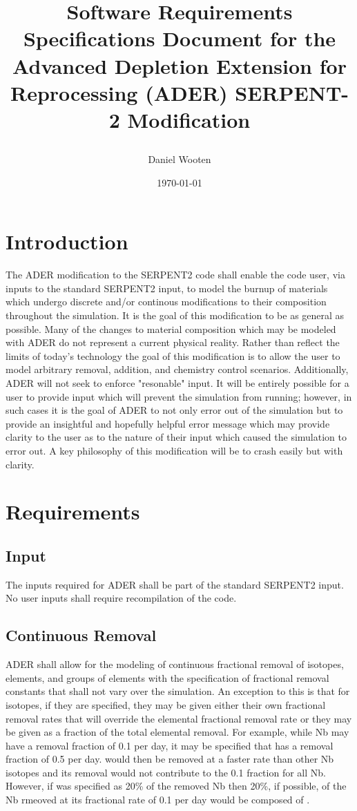 \documentclass[12pt]{article}
\title{Software Requirements Specifications Document for the Advanced Depletion Extension for Reprocessing (ADER) SERPENT-2 Modification \\ {\small \date{\today}}}
\author{Daniel Wooten}
\begin{document}
\maketitle

\section{Introduction}
The ADER modification to the SERPENT2 code shall enable the code user, via
inputs to the standard SERPENT2 input, to model the burnup of materials which
undergo discrete and/or continous modifications to their composition throughout
the simulation. It is the goal of this modification to be as general as
possible. Many of the changes to material composition which may be modeled
with ADER do not represent a current physical reality. Rather than reflect
the limits of today's technology the goal of this modification is to allow
the user to model arbitrary removal, addition, and chemistry control
scenarios. Additionally, ADER will not seek to enforce "resonable" input. It
will be entirely possible for a user to provide input which will prevent
the simulation from running; however, in such cases it is the goal of ADER
to not only error out of the simulation but to provide an insightful and
hopefully helpful error message which may provide clarity to the user as to
the nature of their input which caused the simulation to error out. A key
philosophy of this modification will be to crash easily but with clarity.
\section{Requirements}
\subsection{Input}
The inputs required for ADER shall be part of the standard SERPENT2 input. No
user inputs shall require recompilation of the code.
\subsection{Continuous Removal}
ADER shall allow for the modeling of continuous fractional removal of isotopes,
elements, and groups of elements with the specification of
fractional removal constants that shall not vary over the simulation. An
exception to this is that for isotopes, if they are specified, they may be given
either their own fractional removal rates that will override the elemental
fractional removal rate or they may be given as a fraction of the total
elemental removal. 
For example, while
Nb may have a removal fraction of 0.1 per day, it may be specified that
 has a removal fraction of 0.5 per day. 
would then be removed at a faster rate than other Nb isotopes and its removal
would not contribute to the 0.1 fraction for all Nb. However, if 
 was specified as 20\% of the removed Nb then 20\%,
if possible, of the Nb rmeoved at its fractional rate of 0.1 per day would be
composed of .  
\end{document}
